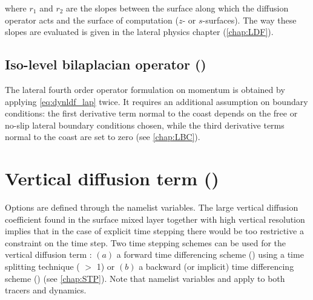 \documentclass[../tex_main/NEMO_manual]{subfiles}
\begin{document}
where $r_1$ and $r_2$ are the slopes between the surface along which the 
diffusion operator acts and the surface of computation ($z$- or $s$-surfaces). 
The way these slopes are evaluated is given in the lateral physics chapter 
(\autoref{chap:LDF}).

\subsection[Iso-level bilaplacian (\protect\np{ln\_dynldf\_bilap}\forcode{ = .true.})]
				{Iso-level bilaplacian operator (\protect{})}
\label{subsec:DYN_ldf_bilap}

The lateral fourth order operator formulation on momentum is obtained by 
applying \autoref{eq:dynldf_lap} twice. It requires an additional assumption on 
boundary conditions: the first derivative term normal to the coast depends on 
the free or no-slip lateral boundary conditions chosen, while the third 
derivative terms normal to the coast are set to zero (see \autoref{chap:LBC}).

\section{Vertical diffusion term (\protect{})}
\label{sec:DYN_zdf}


Options are defined through the  namelist variables.
The large vertical diffusion coefficient found in the surface mixed layer together 
with high vertical resolution implies that in the case of explicit time stepping there 
would be too restrictive a constraint on the time step. Two time stepping schemes 
can be used for the vertical diffusion term : $(a)$ a forward time differencing 
scheme () using a time splitting technique 
( $>$ 1) or $(b)$ a backward (or implicit) time differencing scheme 
() (see \autoref{chap:STP}). Note that namelist variables 
 and  apply to both tracers and dynamics. 
\end{document}
